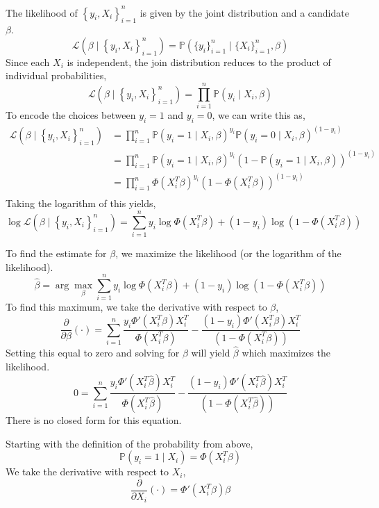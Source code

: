 \documentclass[12pt,twoside]{article}
\begin{document}
\begin{problems}
\begin{problemparts}
\problempart %

The likelihood of $\left\{y_i, X_i\right\}_{i = 1}^n$ is
given by the joint distribution and a candidate $\beta$.
$$ \mathcal{L}\left(\beta \mid \left\{y_i, X_i\right\}_{i = 1}^n\right) =
\mathbb{P} \left(\{y_i\}_{i = 1}^n \mid \{X_i\}_{i = 1}^n, \beta\right) $$
Since each $X_i$ is independent, the join distribution reduces to the product
of individual probabilities,
$$ \mathcal{L}\left(\beta \mid \left\{y_i, X_i\right\}_{i = 1}^n\right) =
\prod_{i = 1}^n \mathbb{P} \left(y_i \mid X_i, \beta\right) $$
To encode the choices between $y_i = 1$ and $y_i = 0$, we can write this as,
\begin{align*}
    \mathcal{L}\left(\beta \mid \left\{y_i, X_i\right\}_{i = 1}^n\right) &=
    \prod_{i = 1}^n \mathbb{P} \left(y_i = 1 \mid X_i, \beta\right)^{y_i}
    \mathbb{P} \left(y_i = 0 \mid X_i, \beta\right)^{(1 - y_i)} \\
    &= \prod_{i = 1}^n \mathbb{P} \left(y_i = 1 \mid X_i, \beta\right)^{y_i}
    \left(1 - \mathbb{P} \left(y_i = 1 \mid X_i, \beta\right)\right)^{(1 -
    y_i)} \\
    &= \boxed{\prod_{i = 1}^n \Phi \left(X_i^T \beta\right)^{y_i} \left(1 -
    \Phi \left(X_i^T \beta\right)\right)^{(1 - y_i)}} \\
\end{align*}
Taking the logarithm of this yields,
$$ \log \mathcal{L}\left(\beta \mid \left\{y_i, X_i\right\}_{i = 1}^n\right)
= \boxed{\sum_{i = 1}^n y_i \log \Phi \left(X_i^T \beta\right) + (1 - y_i)
\log \left(1 - \Phi \left(X_i^T \beta\right)\right)}$$

\problempart %

To find the estimate for $\beta$, we maximize the likelihood (or the
logarithm of the likelihood).
$$ \hat{\beta} = \arg\max_{\beta} \sum_{i = 1}^n y_i \log \Phi \left(X_i^T
\beta\right) + (1 - y_i) \log \left(1 - \Phi \left(X_i^T \beta\right)\right) $$
To find this maximum, we take the derivative with respect to $\beta$,
$$ \frac{\partial}{\partial \beta}(\cdot) = \sum_{i = 1}^n
\frac{y_i\Phi'\left(X_i^T \beta\right) X_i^T }{\Phi \left(X_i^T \beta\right)}
- \frac{(1 - y_i)\Phi'\left(X_i^T \beta\right) X_i^T}{\left(1 - \Phi
\left(X_i^T \beta\right)\right)}$$
Setting this equal to zero and solving for $\beta$ will yield $\hat{\beta}$
which maximizes the likelihood.
$$ 0 = \boxed{\sum_{i = 1}^n \frac{y_i\Phi'\left(X_i^T \hat{\beta}\right) X_i^T
}{\Phi \left(X_i^T \hat{\beta}\right)} - \frac{(1 - y_i)\Phi'\left(X_i^T
\hat{\beta}\right) X_i^T}{\left(1 - \Phi \left(X_i^T
\hat{\beta}\right)\right)}} $$
There is no closed form for this equation.

\problempart %

Starting with the definition of the probability from above,
$$ \mathbb{P}(y_i = 1 \mid X_i) = \boxed{\Phi(X_i^T \beta)} $$
We take the derivative with respect to $X_i$,
$$ \frac{\partial}{\partial X_i}(\cdot) = \boxed{\Phi'(X_i^T \beta) \beta} $$

\end{problemparts}

\end{problems}
\end{document}

